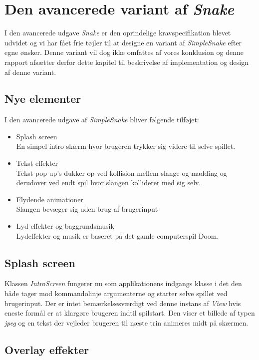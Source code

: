 \documentclass[]{article}
\begin{document}
\section{Den avancerede variant af \textit{Snake}}

I den avancerede udgave \textit{Snake} er den oprindelige kravspecifikation blevet udvidet og vi har fået frie tøjler til at designe en variant af \textit{SimpleSnake} efter egne ønsker. Denne variant vil dog ikke omfattes af vores konklusion og denne rapport afsætter derfor dette kapitel til beskrivelse af implementation og design af denne variant.  

\subsection{Nye elementer}
I den avancerede udgave af \textit{SimpleSnake} bliver følgende tilføjet:
\begin{itemize}
	\item Splash screen \\
	En simpel intro skærm hvor brugeren trykker sig videre til selve spillet.
	\item Tekst effekter \\
	Tekst pop-up's dukker op ved kollision mellem slange og madding og derudover ved endt spil hvor slangen kolliderer med sig selv.
	\item Flydende animationer \\
	Slangen bevæger sig uden brug af brugerinput
	\item Lyd effekter og baggrundsmusik \\
	Lydeffekter og musik er baseret på det gamle computerspil Doom.
	
\end{itemize}
	
	\subsection{Splash screen}
	
	Klassen \textit{IntroScreen} fungerer nu som applikationens indgangs klasse i det den både tager mod kommandolinje argumenterne og starter selve spillet ved brugerinput. Der er intet bemærkelsesværdigt ved denne instans af \textit{View} hvis eneste formål er at klargøre brugeren indtil spilstart. Den viser et billede af typen \textit{jpeg} og en tekst der vejleder brugeren til næste trin animeres midt på skærmen.
	
	\subsection{Overlay effekter}
	
\end{document}
